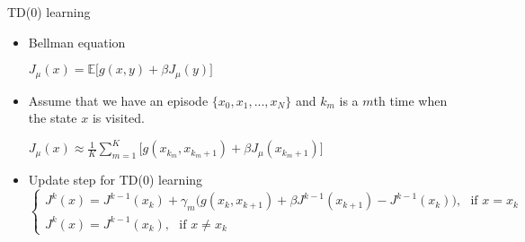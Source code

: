 \documentclass{beamer}
\def\E{{\mathbb E}}
\begin{document}
\begin{frame}{TD(0) learning}
\begin{itemize}

\item Bellman equation

\begin{center}
$
J_\mu(x) = \E\Big[g(x, y) +\beta J_\mu (y)\Big]
$
\end{center}

\item Assume that we have an episode $\{x_0, x_1,...,x_N\}$ and $k_m$ is a $m$th time when the state $x$ is visited.

\begin{center}
$
J_\mu(x) \approx \frac{1}{K} \sum\limits_{m=1}^K \Big[g(x_{k_m}, x_{k_m+1}) +\beta J_\mu (x_{k_m+1})\Big]
$
\end{center}

    \item Update step for TD(0) learning
    $$
    \begin{cases}
  J^k(x) = J^{k-1}(x_k) +\gamma_m\Big(g(x_k, x_{k+1})+\beta J^{k-1}(x_{k+1}) - J^{k-1}(x_k)  \Big), ~~~\text{if }x=x_k\\
  J^k(x) = J^{k-1}(x_k), ~~~\text{if }x\neq x_k
 \end{cases}
 $$









\end{itemize}
\end{frame}
\end{document}
